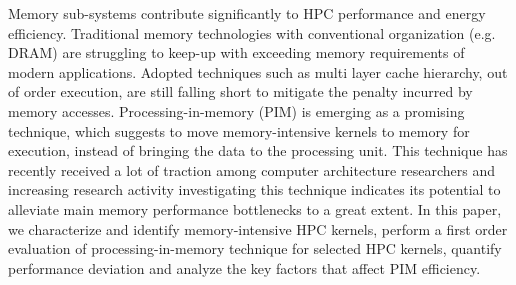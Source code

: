 Memory sub-systems contribute significantly to HPC performance and energy efficiency. Traditional memory technologies with conventional organization (e.g. DRAM) are struggling to keep-up with exceeding memory requirements of modern applications. Adopted techniques such as multi layer cache hierarchy, out of order execution, are still falling short to mitigate the penalty incurred by memory accesses. Processing-in-memory (PIM) is emerging as a promising technique, which suggests to move memory-intensive kernels to memory for execution, instead of bringing the data to the processing unit. This technique has recently received a lot of traction among computer architecture researchers and increasing research activity investigating this technique indicates its potential to alleviate main memory performance bottlenecks to a great extent. In this paper, we characterize and identify memory-intensive HPC kernels, perform a first order evaluation of processing-in-memory technique for selected HPC kernels, quantify performance deviation and analyze the key factors that affect PIM efficiency.   